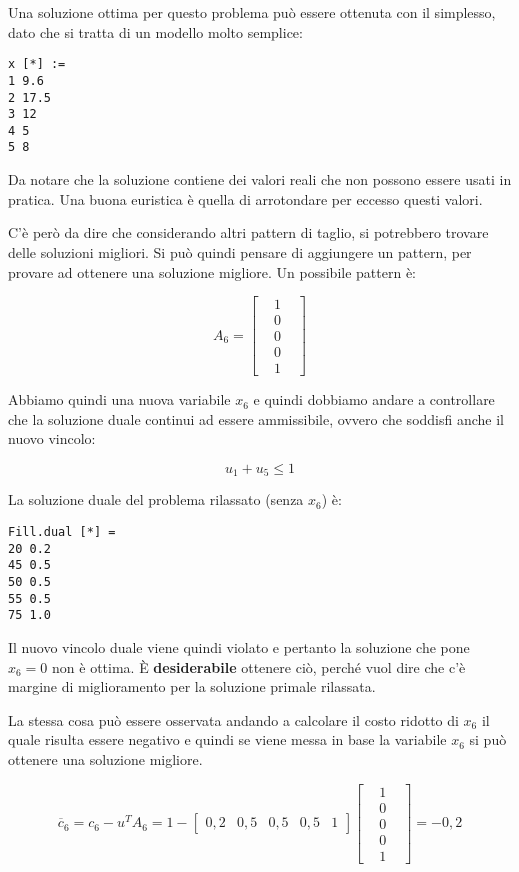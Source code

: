 Una soluzione ottima per questo problema può essere ottenuta con il simplesso, dato che si tratta di un modello molto semplice:

\begin{verbatim}
x [*] := 
1 9.6
2 17.5 
3 12 
4 5 
5 8
\end{verbatim}

Da notare che la soluzione contiene dei valori reali che non possono essere usati in pratica. 
Una buona euristica è quella di arrotondare per eccesso questi valori.

C'è però da dire che considerando altri pattern di taglio, si potrebbero trovare delle soluzioni migliori.
Si può quindi pensare di aggiungere un pattern, per provare ad ottenere una soluzione migliore.
Un possibile pattern è:

$$
 A_6 = \begin{bmatrix}
	&1& \\
	&0& \\
	&0& \\
	&0& \\
	&1&
\end{bmatrix}
$$

Abbiamo quindi una nuova variabile $x_6$ e quindi dobbiamo andare a controllare che la soluzione duale continui ad essere ammissibile, ovvero che soddisfi anche il nuovo vincolo:

$$
u_1 + u_5 \leq 1
$$

La soluzione duale del problema rilassato (senza $x_6$) è:

\begin{verbatim}
Fill.dual [*] =
20 0.2
45 0.5
50 0.5
55 0.5
75 1.0
\end{verbatim}

Il nuovo vincolo duale viene quindi violato e pertanto la soluzione che pone $x_6 = 0$ non è ottima. 
\`E \textbf{desiderabile} ottenere ciò, perché vuol dire che c'è margine di miglioramento per la soluzione primale rilassata.

La stessa cosa può essere osservata andando a calcolare il costo ridotto di $x_6$ il quale risulta essere negativo e quindi se viene messa in base la variabile $x_6$ si può ottenere una soluzione migliore.

$$
\overline{c}_6 = c_6 - u^TA_6 = 1 - \begin{bmatrix}
0,2 & 0,5 & 0,5 & 0,5 & 1
\end{bmatrix} \begin{bmatrix}
&1& \\
&0& \\
&0& \\
&0& \\
&1&
\end{bmatrix} = -0,2
$$


